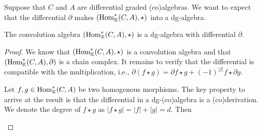 \documentclass[../thesis.tex]{subfiles}
\begin{document}
            Suppose that $C$ and $A$ are differential graded (co)algebras. We want to expect that the differential $\partial$ makes $(\tt{Hom}_\mathbb{K}^*(C,A), \star)$ into a dg-algebra.
            
            \begin{proposition}
                The convolution algebra $(\tt{Hom}_\mathbb{K}^*(C,A),\star)$ is a dg-algebra with differential $\partial$.
            \end{proposition}

            \begin{proof}
                We know that $(\tt{Hom}_\mathbb{K}^*(C,A),\star)$ is a convolution algebra and that $(\tt{Hom}_\mathbb{K}^*(C,A),\partial)$ is a chain complex. It remains to verify that the differential is compatible with the multiplication, i.e., $\partial(f\star g) = \partial{f}\star g + (-1)^{|f|}f\star\partial{g}$.

                Let $f,g\in \tt{Hom}_\mathbb{K}^*(C,A)$ be two homogenous morphisms. The key property to arrive at the result is that the differential in a dg-(co)algebra is a (co)derivation. We denote the degree of $f\star g$ as $|f\star g| = |f| + |g| = d$. Then

                \begin{center}
\end{center}
\end{proof}
\end{document}
